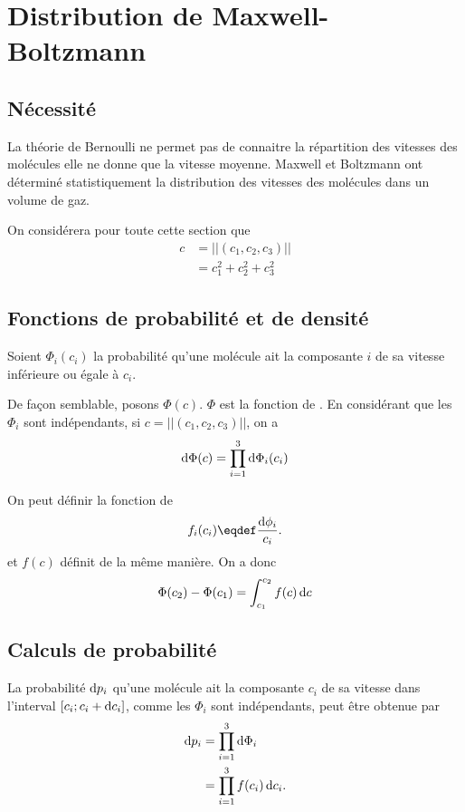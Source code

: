 \section{Distribution de Maxwell-Boltzmann}
\subsection{Nécessité}
La théorie de Bernoulli ne permet pas de connaitre la répartition des vitesses
des molécules elle ne donne que la vitesse moyenne.
Maxwell et Boltzmann ont déterminé statistiquement la distribution
des vitesses des molécules dans un volume de gaz.

On considérera pour toute cette section que
\begin{align}
  c & = ||(c_1, c_2, c_3)||\label{eq:cci}\\
  & = c_1^2 + c_2^2 + c_3^2\nonumber
\end{align}

\subsection{Fonctions de probabilité et de densité}

Soient $\Phi_i(c_i)$ la probabilité qu'une molécule ait la composante $i$
de sa vitesse inférieure ou égale à $c_i$.

De façon semblable, posons $\Phi(c)$.
$\Phi$ est la fonction de .
En considérant que les $\Phi_i$ sont
indépendants, si $c = ||(c_1, c_2, c_3)||$, on a
\[ \operatorname{d}\!\Phi(c) = \prod_{i=1}^3 \operatorname{d}\!\Phi_i(c_i) \]

On peut définir la fonction de 
\[ f_i(c_i) \eqdef \frac{\dif\phi_i}{c_i}. \]
et $f(c)$ définit de la même manière.
On a donc
\[ \Phi(c_2) - \Phi(c_1) = \int_{c_1}^{c_2} f(c) \operatorname{d}\! c \]

\subsection{Calculs de probabilité}
La probabilité $\operatorname{d}\! p_i$ qu'une molécule ait
la composante $c_i$ de sa vitesse dans l'interval $[c_i; c_i + \operatorname{d}\! c_i]$,
comme les $\Phi_i$ sont indépendants, peut être obtenue par
\begin{align*}
  \operatorname{d}\! p_i & = \prod_{i=1}^3 \operatorname{d}\!\Phi_i\\
  & = \prod_{i=1}^3 f(c_i) \operatorname{d}\! c_i.
\end{align*}

